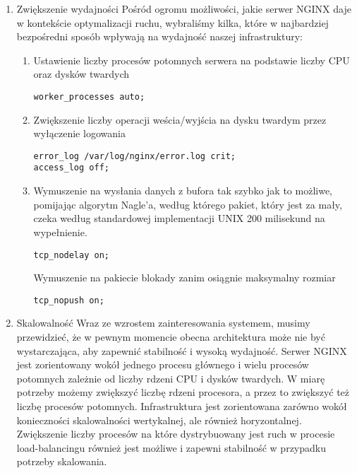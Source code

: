 \documentclass[12pt]{article}
\begin{document}
\begin{enumerate}
\item{Zwiększenie wydajności}
Pośród ogromu możliwości, jakie serwer NGINX daje w kontekście optymalizacji ruchu, wybraliśmy kilka, które w najbardziej bezpośredni sposób wpływają na wydajność naszej infrastruktury:

\begin{enumerate}
\item
Ustawienie liczby procesów potomnych serwera na podstawie liczby CPU oraz dysków twardych
\begin{lstlisting}
worker_processes auto;
\end{lstlisting}
\item
Zwiększenie liczby operacji weścia/wyjścia na dysku twardym przez wyłączenie logowania
\begin{lstlisting}
error_log /var/log/nginx/error.log crit;
access_log off;
\end{lstlisting}
\item
Wymuszenie na  wysłania danych z bufora tak szybko jak to możliwe, pomijając algorytm Nagle'a, według którego pakiet, który jest za mały, czeka według standardowej implementacji UNIX 200 milisekund na wypełnienie.
\begin{lstlisting}
tcp_nodelay on;
\end{lstlisting}
Wymuszenie na pakiecie blokady zanim osiągnie maksymalny rozmiar
\begin{lstlisting}
tcp_nopush on;
\end{lstlisting}
\end{enumerate}

\item{Skalowalność}
Wraz ze wzrostem zainteresowania systemem, musimy przewidzieć, że w pewnym momencie obecna architektura może nie być wystarczająca, aby zapewnić stabilność i wysoką wydajność. Serwer NGINX jest zorientowany wokół jednego procesu głównego i wielu procesów potomnych zależnie od liczby rdzeni CPU i dysków twardych. W miarę potrzeby możemy zwiększyć liczbę rdzeni procesora, a przez to zwiększyć też liczbę procesów potomnych.
Infrastruktura jest zorientowana zarówno wokół konieczności skalowalności wertykalnej, ale również horyzontalnej. Zwiększenie liczby procesów na które dystrybuowany jest ruch w procesie load-balancingu również jest możliwe i zapewni stabilność w przypadku potrzeby skalowania.
\end{enumerate}
\end{document}
